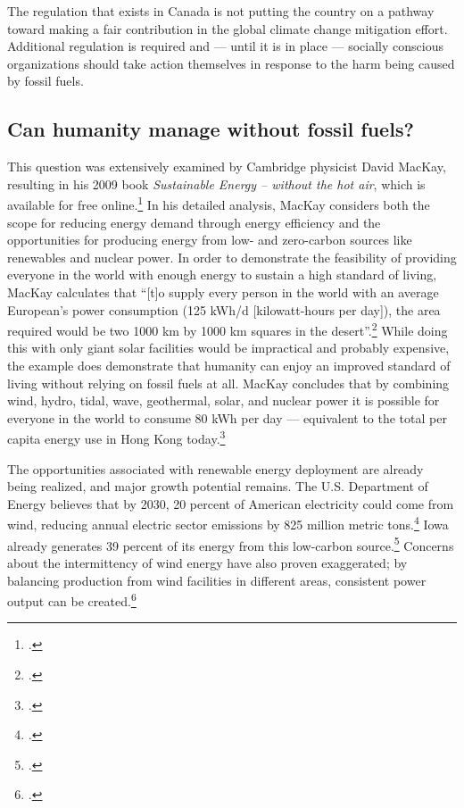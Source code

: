 The regulation that exists in Canada is not putting the country on a pathway toward making a fair contribution in the global climate change mitigation effort.
Additional regulation is required and --- until it is in place --- socially conscious organizations should take action themselves in response to the harm being caused by fossil fuels.


	
	\subsection{Can humanity manage without fossil fuels?}
	\label{DoingWithout}



This question was extensively examined by Cambridge physicist David MacKay, resulting in his 2009 book \emph{Sustainable Energy – without the hot air}, which is available for free online.\footcite[][]{MacKay2009}
In his detailed analysis, MacKay considers both the scope for reducing energy demand through energy efficiency and the opportunities for producing energy from low- and zero-carbon sources like renewables and nuclear power.
In order to demonstrate the feasibility of providing everyone in the world with enough energy to sustain a high standard of living, MacKay calculates that ``[t]o supply every person in the world with an average European's power consumption (125 kWh/d [kilowatt-hours per day]), the area required would be two 1000 km by 1000 km squares in the desert''.\footcite[][p. 178]{MacKay2009}
While doing this with only giant solar facilities would be impractical and probably expensive, the example does demonstrate that humanity can enjoy an improved standard of living without relying on fossil fuels at all.
MacKay concludes that by combining wind, hydro, tidal, wave, geothermal, solar, and nuclear power it is possible for everyone in the world to consume 80 kWh per day --- equivalent to the total per capita energy use in Hong Kong today.\footcite[][p. 106, 238]{MacKay2009}



The opportunities associated with renewable energy deployment are already being realized, and major growth potential remains.
The U.S. Department of Energy believes that by 2030, 20 percent of American electricity could come from wind, reducing annual electric sector  emissions by 825 million metric tons.\footcite[][]{20PercentBy2030}
Iowa already generates 39 percent of its energy from this low-carbon source.\footcite[][]{BlownAway}
Concerns about the intermittency of wind energy have also proven exaggerated; by balancing production from wind facilities in different areas, consistent power output can be created.\footcite[][]{BlownAway}



